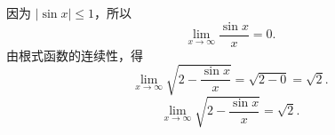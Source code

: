 \begin{solution}

    因为 $|\sin x| \leqslant 1$，所以
    \begin{equation}
        \lim_{x\to\infty} \frac{\sin x}{x} = 0.
    \end{equation}
    由根式函数的连续性，得
    \begin{equation}
        \lim_{x\to\infty} \sqrt{2-\frac{\sin x}{x}} = \sqrt{2 - 0} = \sqrt{2}.
    \end{equation}
    \begin{equation}
        \boxed{\lim_{x\to\infty} \sqrt{2-\frac{\sin x}{x}} = \sqrt{2}.}
    \end{equation}
\end{solution}

\endinput
